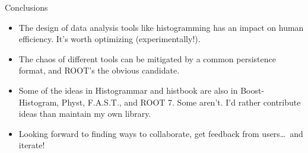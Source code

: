 \documentclass[aspectratio=169]{beamer}
\begin{document}
\begin{frame}{Conclusions}
\Large
\vspace{0.25 cm}
\begin{itemize}\setlength{\itemsep}{0.25 cm}
\item The design of data analysis tools like histogramming has an impact on human efficiency. It's worth optimizing (experimentally!).
\item The chaos of different tools can be mitigated by a common persistence format, and ROOT's the obvious candidate.
\item Some of the ideas in Histogrammar and histbook are also in Boost-Histogram, Physt, F.A.S.T., and ROOT 7. Some aren't. I'd rather contribute ideas than maintain my own library.
\item Looking forward to finding ways to collaborate, get feedback from users\ldots\ and iterate!
\end{itemize}
\end{frame}
\end{document}
